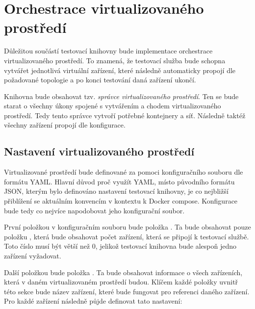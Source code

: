 \section{Orchestrace virtualizovaného prostředí}

Důležitou součástí testovací knihovny bude implementace orchestrace virtualizovaného prostředí. To znamená, že testovací služba bude schopna vytvářet jednotlivá virtuální zařízení, které následně automaticky propojí dle požadované topologie a po konci testování daná zařízení ukončí. 

Knihovna bude obsahovat tzv. \textit{správce virtualizovaného prostředí}. Ten se bude starat o všechny úkony spojené s vytvářením a chodem virtualizovaného prostředí. Tedy tento správce vytvoří potřebné kontejnery a síť. Následně taktéž všechny zařízení propojí dle konfigurace. 

\subsection{Nastavení virtualizovaného prostředí}\label{sec:env_conf}

Virtualizované prostředí bude definované za pomoci konfiguračního souboru dle formátu YAML. Hlavní důvod proč využít YAML, místo původního formátu JSON, kterým bylo definováno nastavení testovací knihovny, je co nejbližší přiblížení se aktuálním konvencím v kontextu k Docker compose. Konfigurace bude tedy co nejvíce napodobovat jeho konfigurační soubor. 

První položkou v konfiguračním souboru bude položka . Ta bude obsahovat pouze položku , která bude obsahovat počet zařízení, která se připojí k testovací službě. Toto číslo musí být větší než 0, jelikož testovací knihovna bude alespoň jedno zařízení vyžadovat.

Další položkou bude položka . Ta bude obsahovat informace o všech zařízeních, která v daném virtualizovaném prostředí budou. Klíčem každé položky uvnitř této sekce bude název zařízení, které bude fungovat pro referenci daného zařízení. Pro každé zařízení následně půjde definovat tato nastavení: 

